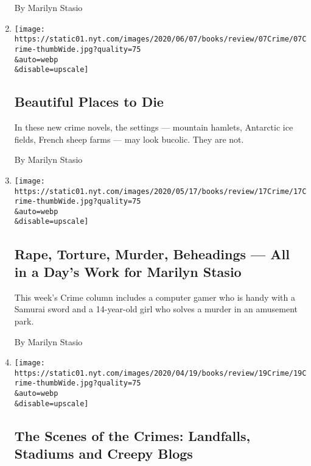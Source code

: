 \begin{enumerate}
  By Marilyn Stasio
\item
  \href{/2020/06/05/books/review/crime-fiction-michael-connelly.html}{}

  \texttt{[image: https://static01.nyt.com/images/2020/06/07/books/review/07Crime/07Crime-thumbWide.jpg?quality=75\\\&auto=webp\\\&disable=upscale]}

  \hypertarget{beautiful-places-to-die}{%
  \subsection{Beautiful Places to Die}\label{beautiful-places-to-die}}

  In these new crime novels, the settings --- mountain hamlets,
  Antarctic ice fields, French sheep farms --- may look bucolic. They
  are not.

  By Marilyn Stasio
\item
  \href{/2020/05/15/books/review/crime-fiction-victim-2117-jussi-adler-olsen.html}{}

  \texttt{[image: https://static01.nyt.com/images/2020/05/17/books/review/17Crime/17Crime-thumbWide.jpg?quality=75\\\&auto=webp\\\&disable=upscale]}

  \hypertarget{rape-torture-murder-beheadings--all-in-a-days-work-for-marilyn-stasio}{%
  \subsection{Rape, Torture, Murder, Beheadings --- All in a Day's Work
  for Marilyn
  Stasio}\label{rape-torture-murder-beheadings--all-in-a-days-work-for-marilyn-stasio}}

  This week's Crime column includes a computer gamer who is handy with a
  Samurai sword and a 14-year-old girl who solves a murder in an
  amusement park.

  By Marilyn Stasio
\item
  \href{/2020/04/17/books/review/crime-fiction-stasio-john-sandford.html}{}

  \texttt{[image: https://static01.nyt.com/images/2020/04/19/books/review/19Crime/19Crime-thumbWide.jpg?quality=75\\\&auto=webp\\\&disable=upscale]}

  \hypertarget{the-scenes-of-the-crimes-landfalls-stadiums-and-creepy-blogs}{%
  \subsection{The Scenes of the Crimes: Landfalls, Stadiums and Creepy
  Blogs}\label{the-scenes-of-the-crimes-landfalls-stadiums-and-creepy-blogs}}


\end{enumerate}
